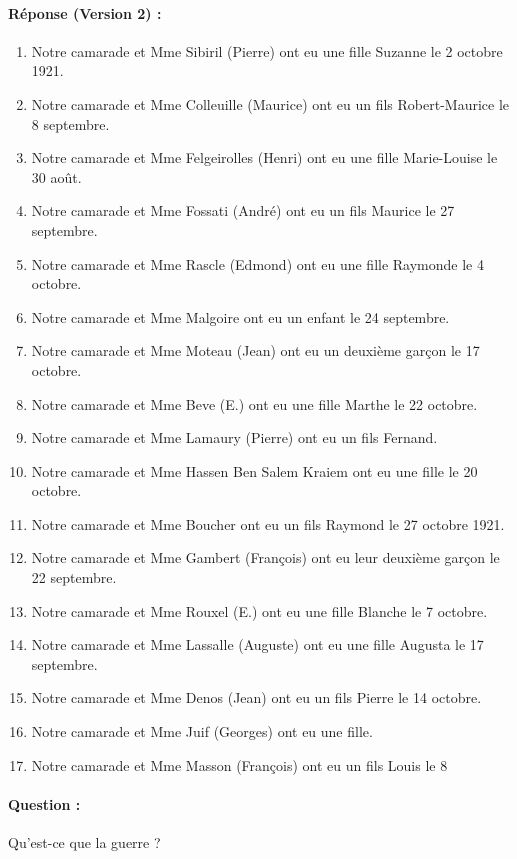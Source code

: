 \paragraph{Réponse (Version 2) :}
\begin{enumerate}
    \item Notre camarade et Mme Sibiril (Pierre) ont eu une fille Suzanne le 2 octobre 1921.
    \item Notre camarade et Mme Colleuille (Maurice) ont eu un fils Robert-Maurice le 8 septembre.
    \item Notre camarade et Mme Felgeirolles (Henri) ont eu une fille Marie-Louise le 30 août.
    \item Notre camarade et Mme Fossati (André) ont eu un fils Maurice le 27 septembre.
    \item Notre camarade et Mme Rascle (Edmond) ont eu une fille Raymonde le 4 octobre.
    \item Notre camarade et Mme Malgoire ont eu un enfant le 24 septembre.
    \item Notre camarade et Mme Moteau (Jean) ont eu un deuxième garçon le 17 octobre.
    \item Notre camarade et Mme Beve (E.) ont eu une fille Marthe le 22 octobre.
    \item Notre camarade et Mme Lamaury (Pierre) ont eu un fils Fernand.
    \item Notre camarade et Mme Hassen Ben Salem Kraiem ont eu une fille le 20 octobre.
    \item Notre camarade et Mme Boucher ont eu un fils Raymond le 27 octobre 1921.
    \item Notre camarade et Mme Gambert (François) ont eu leur deuxième garçon le 22 septembre.
    \item Notre camarade et Mme Rouxel (E.) ont eu une fille Blanche le 7 octobre.
    \item Notre camarade et Mme Lassalle (Auguste) ont eu une fille Augusta le 17 septembre.
    \item Notre camarade et Mme Denos (Jean) ont eu un fils Pierre le 14 octobre.
    \item Notre camarade et Mme Juif (Georges) ont eu une fille.
    \item Notre camarade et Mme Masson (François) ont eu un fils Louis le 8
\end{enumerate}

\separation

\paragraph{Question :} Qu'est-ce que la guerre ?

